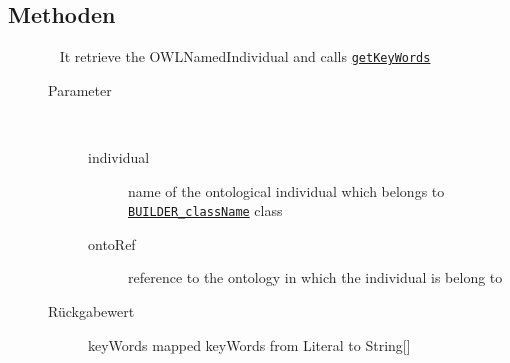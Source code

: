 \subsection{Methoden}
\begin{description}
\item[{\label{ontologyFramework.OFRunning.OFInitialising.OFBuilderCommon.getKeyWords(java.lang.String,ontologyFramework.OFContextManagement.OWLReferences)}}]
~ It retrieve the OWLNamedIndividual and calls \texttt{\hyperlink{ontologyFramework.OFRunning.OFInitialising.OFBuilderCommon.getKeyWords(org.semanticweb.owlapi.model.OWLNamedIndividual,ontologyFramework.OFContextManagement.OWLReferences)}{getKeyWords}}
\begin{description}
\item[Parameter] ~
\begin{description}
\item[individual]
name of the ontological individual which belongs to \texttt{\hyperlink{ontologyFramework.OFRunning.OFInitialising.OFInitialiser.BUILDER_className}{BUILDER_className}} class
\item[ontoRef]
reference to the ontology in which the individual is belong to
\end{description}
\item[Rückgabewert] 
keyWords mapped keyWords from Literal to String[]
 

\end{description}
\end{description}
